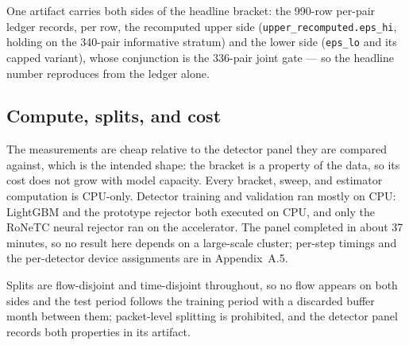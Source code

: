 One artifact carries both sides of the headline bracket: the 990-row per-pair
ledger records, per row, the recomputed upper side
(\texttt{upper\_recomputed.eps\_hi}, holding on the 340-pair informative
stratum) and the lower side (\texttt{eps\_lo} and its capped variant), whose
conjunction is the 336-pair joint gate --- so the headline number reproduces from
the ledger alone.

\subsection{Compute, splits, and cost}
\label{sec:design/compute}

The measurements are cheap relative to the detector panel they are compared
against, which is the intended shape: the bracket is a property of the data, so
its cost does not grow with model capacity. Every bracket, sweep, and estimator
computation is CPU-only. Detector training and validation ran mostly on CPU:
LightGBM and the prototype rejector both executed on CPU, and only the RoNeTC
neural rejector ran on the accelerator. The panel completed in about 37 minutes,
so no result here depends on a large-scale cluster; per-step timings and the
per-detector device assignments are in Appendix~A.5.

Splits are flow-disjoint and time-disjoint throughout, so no flow appears on
both sides and the test period follows the training period with a discarded
buffer month between them; packet-level splitting is prohibited, and the detector
panel records both properties in its artifact.


